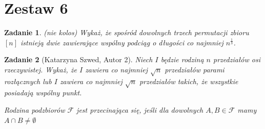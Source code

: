 \documentclass{mwart}
\newtheorem{zad}{Zadanie}[section]
\begin{document}
\newpage
\section{Zestaw 6}          %

\begin{zad}(nie kolos)
    Wykaż, że spośród dowolnych trzech permutacji zbioru $[n]$
    istnieją dwie zawierające wspólny podciąg o długości co najmniej $n^{\frac{1}{3}}$.
\end{zad}
\begin{mdframed}

\end{mdframed}
\begin{mdframed}

\end{mdframed}


\begin{zad}[Katarzyna Szwed, Autor 2]
    Niech $I$ będzie rodziną $n$ przedziałów osi rzeczywistej.
    Wykaż, że $I$ zawiera co najmniej $\sqrt{n}$ przedziałów
    parami rozłącznych lub $I$ zawiera co najmniej $\sqrt{n}$
    przedziałów takich, że wszystkie posiadają wspólny punkt.

    Rodzina podzbiorów $\mathcal{F}$ jest przecinająca się, jeśli
    dla dowolnych $A, B \in \mathcal{F}$ mamy $A \cap B \neq \emptyset$
\end{zad}
\end{document}
